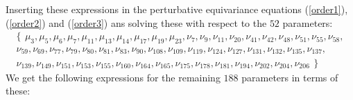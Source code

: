 \documentclass[a4paper,12pt, DIV=14, BCOR=5mm, twoside, headsepline, numbers=noenddot]{scrbook}
\begin{document}
Inserting these expressions in the perturbative equivariance equations (\ref{order1}), (\ref{order2}) and (\ref{order3}) ans solving these with respect to the $52$ parameters:
\begin{multline}\label{AreaParas}
\bigl\{\,\  \mu_{{3}},\mu_{{5}},\mu_{{6}},\mu_{{7}},\mu_{{11}},\mu_{{13}}
,\mu_{{14}},\mu_{{17}},\mu_{{19}},\mu_{{23}},\nu_{{7}},\nu_{{9}},\nu_{
{11}},\nu_{{20}},\nu_{{41}},\nu_{{42}},\nu_{{48}},\nu_{{51}},\nu_{{55}
},\nu_{{58}},\\\nu_{{59}},\nu_{{69}},\nu_{{77}},\nu_{{79}},\nu_{{80}},
\nu_{{81}},\nu_{{83}},\nu_{{90}},\nu_{{108}},\nu_{{109}},\nu_{{119}},
\nu_{{124}},\nu_{{127}},\nu_{{131}},\nu_{{132}},\nu_{{135}},\nu_{{137}
},\\\nu_{{139}},\nu_{{149}},\nu_{{151}},\nu_{{153}},\nu_{{155}},\nu_{{
160}},\nu_{{164}},\nu_{{165}},\nu_{{175}},\nu_{{178}},\nu_{{181}},\nu_
{{194}},\nu_{{202}},\nu_{{204}},\nu_{{206}} \,\  \bigr\}
\end{multline}
We get the following expressions for the remaining $188$ parameters in terms of these:
\end{document}
